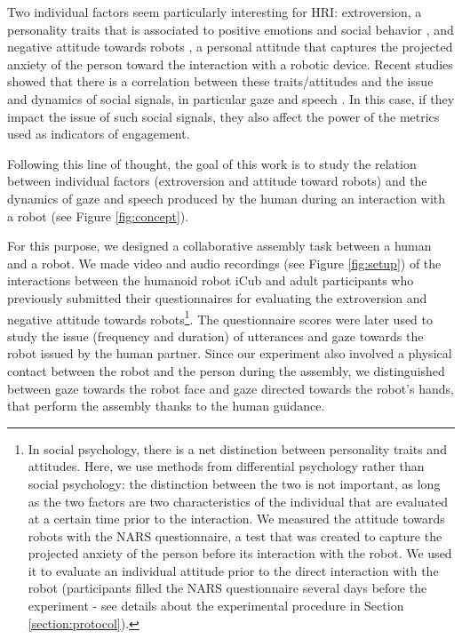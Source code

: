 Two individual factors seem particularly interesting for HRI: extroversion, a personality traits that is associated to positive emotions and social behavior \cite{BIGFIVE}, and negative attitude towards robots \cite{NARS2006}, a personal attitude that captures the projected anxiety of the person toward the interaction with a robotic device. 
Recent studies showed that there is a correlation between these traits/attitudes and the issue and dynamics of social signals, in particular gaze and speech \cite{Nomura2008}.
In this case, if they impact the issue of such social signals, they also affect the power of the metrics used as indicators of engagement.

Following this line of thought, the goal of this work is to study the relation between individual factors (extroversion and attitude toward robots) and the dynamics of gaze and speech produced by the human during an interaction with a robot (see Figure \ref{fig:concept}).

For this purpose, we designed a collaborative assembly task between a human and a robot. We made video and audio recordings (see Figure \ref{fig:setup}) of the interactions between the humanoid robot iCub and adult participants who previously submitted their questionnaires for evaluating the extroversion and negative attitude towards robots\footnote{In social psychology, there is a net distinction between personality traits and attitudes. Here, we use methods from differential psychology rather than social psychology: the distinction between the two is not important, as long as the two factors are two characteristics of the individual that are evaluated at a certain time prior to the interaction. We measured the attitude towards robots with the NARS questionnaire, a test that was created to capture the projected anxiety of the person before its interaction with the robot. We used it to evaluate an individual attitude prior to the direct interaction with the robot (participants filled the NARS questionnaire several days before the experiment - see details about the experimental procedure in Section \ref{section:protocol}).}. 
The questionnaire scores were later used to study the issue (frequency and duration) of utterances and gaze towards the robot issued by the human partner. Since our experiment also involved a physical contact between the robot and the person during the assembly, we distinguished between gaze towards the robot face and gaze directed towards the robot's hands, that perform the assembly thanks to the human guidance.


